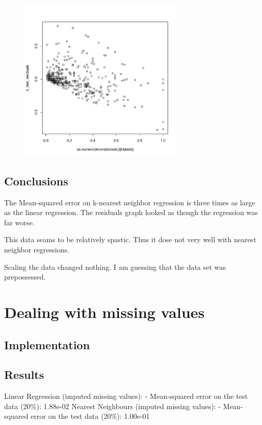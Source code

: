 \documentclass[12pt,a4paper]{article}
\begin{document}
\begin{singlespace}
\vspace{-0.5cm}
\begin{figure}[h!]
    \centering
    \includegraphics[width=0.7\textwidth,trim= 0 0 20 30, clip]{NN_regression_residuals.pdf}
\end{figure}
\FloatBarrier


\subsection{Conclusions}
The Mean-squared error on k-nearest neighbor regression is three times as 
 large as the linear regression. The residuals graph looked as though the regression
 was far worse.
 
 This data seams to be relatively spastic. Thus it dose not very well 
 with nearest neighbor regressions.

 Scaling the data changed nothing. I am guessing that the data set was prepossessed.

\section{Dealing with missing values}
\subsection{Implementation}




\subsection{Results}
Linear Regression (imputed missing values):
 - Mean-squared error on the test data (20\%): 1.88e-02
Nearest Neighbours (imputed missing values):
 - Mean-squared error on the test data (20\%): 1.00e-01


\end{singlespace}
\end{document}
